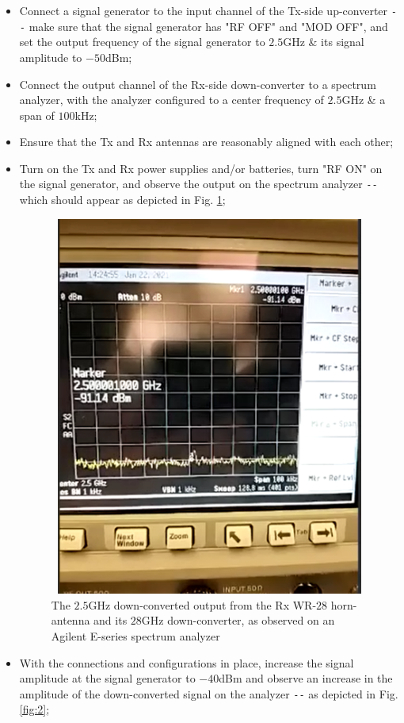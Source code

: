 \documentclass[12pt, draftcls, onecolumn]{IEEEtran}
\begin{document}
\begin{enumerate}
    \begin{itemize}
        \item Connect a signal generator to the input channel of the Tx-side up-converter \texttt{-{}-} make sure that the signal generator has "RF OFF" and "MOD OFF", and set the output frequency of the signal generator to $2.5$GHz \& its signal amplitude to $-50$dBm;
        \item Connect the output channel of the Rx-side down-converter to a spectrum analyzer, with the analyzer configured to a center frequency of $2.5$GHz \& a span of $100$kHz;
        \item Ensure that the Tx and Rx antennas are reasonably aligned with each other;
        \item Turn on the Tx and Rx power supplies and/or batteries, turn "RF ON" on the signal generator, and observe the output on the spectrum analyzer \texttt{-{}-} which should appear as depicted in Fig. \ref{fig:1};
        \begin{figure}
            \centering
            \includegraphics[width=15cm, height=12.5cm]{1.png}
            \caption{The $2.5$GHz down-converted output from the Rx WR-$28$ horn-antenna and its $28$GHz down-converter, as observed on an Agilent E-series spectrum analyzer}
            \label{fig:1}
        \end{figure}
        \item With the connections and configurations in place, increase the signal amplitude at the signal generator to $-40$dBm and observe an increase in the amplitude of the down-converted signal on the analyzer \texttt{-{}-} as depicted in Fig. \ref{fig:2};

\end{itemize}
\end{enumerate}
\end{document}
